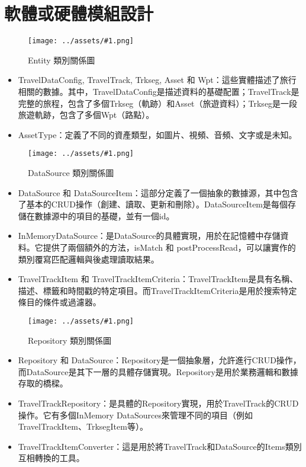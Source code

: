\section{軟體或硬體模組設計}

\newcommand{\customfig}[2]{
  \begin{figure}[H]
    \centering
    \texttt{[image: ../assets/\#1.png]}
    \caption{#2}
    \label{#2}
  \end{figure}
}

\customfig{UML-Entity}{Entity 類別關係圖}

\begin{itemize}
  \item TravelDataConfig, TravelTrack, Trkseg, Asset 和 Wpt：這些實體描述了旅行相關的數據。其中，TravelDataConfig是描述資料的基礎配置；TravelTrack是完整的旅程，包含了多個Trkseg（軌跡）和Asset（旅遊資料）；Trkseg是一段旅遊軌跡，包含了多個Wpt（路點）。
  \item AssetType：定義了不同的資產類型，如圖片、視頻、音頻、文字或是未知。
\end{itemize}

\customfig{UML-DataSource}{DataSource 類別關係圖}

\begin{itemize}
  \item DataSource 和 DataSourceItem：這部分定義了一個抽象的數據源，其中包含了基本的CRUD操作（創建、讀取、更新和刪除）。DataSourceItem是每個存儲在數據源中的項目的基礎，並有一個id。
  \item InMemoryDataSource：是DataSource的具體實現，用於在記憶體中存儲資料。它提供了兩個額外的方法，isMatch 和 postProcessRead，可以讓實作的類別覆寫匹配邏輯與後處理讀取結果。
  \item TravelTrackItem 和 TravelTrackItemCriteria：TravelTrackItem是具有名稱、描述、標籤和時間戳的特定項目。而TravelTrackItemCriteria是用於搜索特定條目的條件或過濾器。
\end{itemize}

\customfig{UML-Repository}{Repository 類別關係圖}

\begin{itemize}
  \item Repository 和 DataSource：Repository是一個抽象層，允許進行CRUD操作，而DataSource是其下一層的具體存儲實現。Repository是用於業務邏輯和數據存取的橋樑。
  \item TravelTrackRepository：是具體的Repository實現，用於TravelTrack的CRUD操作。它有多個InMemory DataSources來管理不同的項目（例如TravelTrackItem、TrksegItem等）。
  \item TravelTrackItemConverter：這是用於將TravelTrack和DataSource的Items類別互相轉換的工具。
\end{itemize}